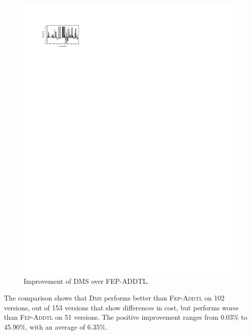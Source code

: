 \begin{figure}[tbp]
    \centering
    \includegraphics[width=12cm]{our_vs_fep.pdf}
    \caption{Improvement of D{\scriptsize MS} over F{\scriptsize EP}-A{\scriptsize DDTL}.}
    \label{fig:our_vs_fep}
\end{figure}

The comparison shows that \textsc{Dms} performs better than \textsc{Fep-Addtl} 
on 102 versions, out of 153 versions that show differences in cost, but performs worse than
\textsc{Fep-Addtl} on 51 versions.
The positive improvement ranges from 0.03\% to 45.90\%, with an average of 6.35\%.


